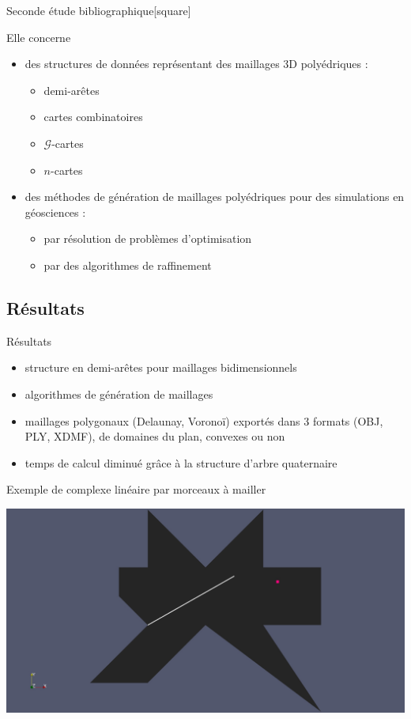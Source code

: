 \documentclass[aspectratio=169, 12pt, a4paper, hyperref={pdfauthor={Alexandre MARIN}, pdfkeywords={IFPEN, Delaunay, Voronoi, mesh generation}, colorlinks=true, linkcolor=purple, urlcolor=blue, citecolor=magenta}]{beamer}
\begin{document}
\begin{Energie}{Seconde étude bibliographique}[square]

Elle concerne

\begin{itemize}
\item des structures de données représentant des maillages 3D polyédriques :
\begin{itemize}
\item demi-arêtes
\item cartes combinatoires
\item $\mathcal{G}$-cartes
\item $n$-cartes
\end{itemize}
\item des méthodes de génération de maillages polyédriques pour des simulations en géosciences :
\begin{itemize}
\item par résolution de problèmes d'optimisation
\item par des algorithmes de raffinement
\end{itemize}
\end{itemize}
\end{Energie}

\subsection{Résultats}
\begin{Energie}{Résultats}
\begin{itemize}
\item structure en demi-arêtes pour maillages bidimensionnels
\item algorithmes de génération de maillages
\item maillages polygonaux (Delaunay, Voronoï) exportés dans $3$ formats (OBJ, PLY, XDMF), de domaines du plan, convexes ou non
\item temps de calcul diminué grâce à la structure d'arbre quaternaire
\end{itemize}
\end{Energie}

\begin{Energie}{\normalsize Exemple de complexe linéaire par morceaux à mailler}
\begin{center}
\includegraphics[scale=0.18, viewport=430 0 1800 1129, clip]{odd_plc.jpg}
\end{center}
\end{Energie}
\end{document}
